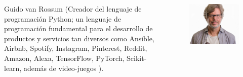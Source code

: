 \documentclass[aspectratio=169]{beamer}
\begin{document}
\begin{frame}
\begin{columns}
\begin{column}{0.5\textwidth}
Guido van Rossum (Creador del lenguaje de programación Python; un lenguaje de programación fundamental para el desarrollo de productos y servicios tan diversos como Ansible, Airbnb, Spotify, Instagram, Pinterest, Reddit, Amazon, Alexa, TensorFlow, PyTorch, Scikit-learn, además de video-juegos ).\\
\end{column}
\begin{column}{0.5\textwidth}
\begin{figure}
\includegraphics[width=.8\textwidth]{Guido.jpg}
\end{figure}   
\end{column}
\end{columns}
\end{frame}
\end{document}
